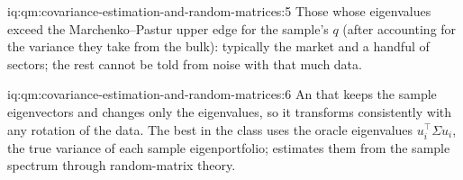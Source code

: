 \begin{solution}{iq:qm:covariance-estimation-and-random-matrices:5}
Those whose eigenvalues exceed the Marchenko--Pastur upper edge for the sample's $q$ (after accounting for the variance they take from the bulk): typically the market and a handful of
sectors; the rest cannot be told from noise with that much data.
\end{solution}

\begin{solution}{iq:qm:covariance-estimation-and-random-matrices:6}
An  that keeps the sample eigenvectors and changes only the eigenvalues, so it transforms consistently with any rotation of the data. The best in the class uses the oracle
eigenvalues $u_i^\top\Sigma u_i$, the true variance of each sample eigenportfolio;  estimates them from the sample spectrum through random-matrix theory.
\end{solution}
